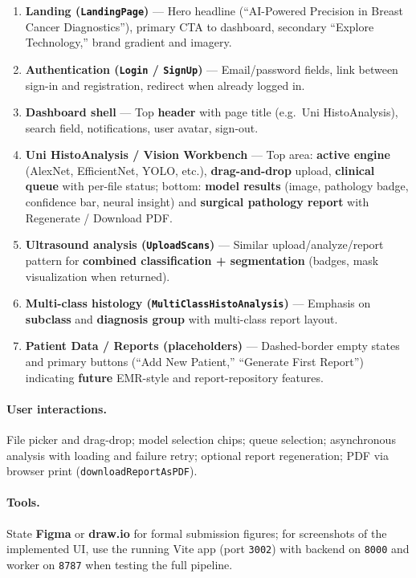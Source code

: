 \begin{enumerate}
  \item \textbf{Landing (\texttt{LandingPage})} --- Hero headline (``AI-Powered Precision in Breast Cancer Diagnostics''), primary CTA to dashboard, secondary ``Explore Technology,'' brand gradient and imagery.
  \item \textbf{Authentication (\texttt{Login} / \texttt{SignUp})} --- Email/password fields, link between sign-in and registration, redirect when already logged in.
  \item \textbf{Dashboard shell} --- Top \textbf{header} with page title (e.g.\ Uni HistoAnalysis), search field, notifications, user avatar, sign-out.
  \item \textbf{Uni HistoAnalysis / Vision Workbench} --- Top area: \textbf{active engine} (AlexNet, EfficientNet, YOLO, etc.), \textbf{drag-and-drop} upload, \textbf{clinical queue} with per-file status; bottom: \textbf{model results} (image, pathology badge, confidence bar, neural insight) and \textbf{surgical pathology report} with Regenerate / Download PDF.
  \item \textbf{Ultrasound analysis (\texttt{UploadScans})} --- Similar upload/analyze/report pattern for \textbf{combined classification + segmentation} (badges, mask visualization when returned).
  \item \textbf{Multi-class histology (\texttt{MultiClassHistoAnalysis})} --- Emphasis on \textbf{subclass} and \textbf{diagnosis group} with multi-class report layout.
  \item \textbf{Patient Data / Reports (placeholders)} --- Dashed-border empty states and primary buttons (``Add New Patient,'' ``Generate First Report'') indicating \textbf{future} EMR-style and report-repository features.
\end{enumerate}

\paragraph{User interactions.}
File picker and drag-drop; model selection chips; queue selection; asynchronous analysis with loading and failure retry; optional report regeneration; PDF via browser print (\texttt{downloadReportAsPDF}).

\paragraph{Tools.}
State \textbf{Figma} or \textbf{draw.io} for formal submission figures; for screenshots of the implemented UI, use the running Vite app (port \texttt{3002}) with backend on \texttt{8000} and worker on \texttt{8787} when testing the full pipeline.

